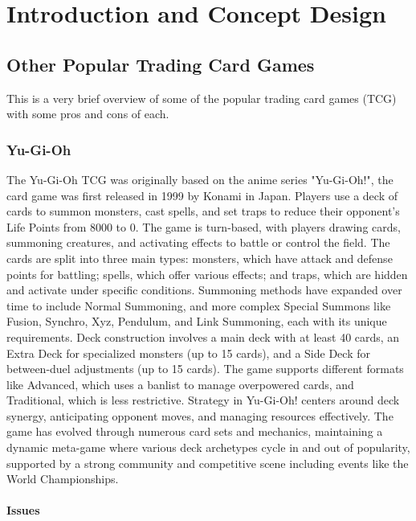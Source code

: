 \chapter{Introduction and Concept Design}




\section{Other Popular Trading Card Games}

This is a very brief overview of some of the popular trading card games (TCG) with some pros and cons of each.


\subsection{Yu-Gi-Oh}

The Yu-Gi-Oh TCG was originally based on the anime series "Yu-Gi-Oh!", the card game was first released in 1999 by Konami in Japan. Players use a deck of cards to summon monsters, cast spells, and set traps to reduce their opponent's Life Points from 8000 to 0. The game is turn-based, with players drawing cards, summoning creatures, and activating effects to battle or control the field. The cards are split into three main types: monsters, which have attack and defense points for battling; spells, which offer various effects; and traps, which are hidden and activate under specific conditions. Summoning methods have expanded over time to include Normal Summoning, and more complex Special Summons like Fusion, Synchro, Xyz, Pendulum, and Link Summoning, each with its unique requirements. Deck construction involves a main deck with at least 40 cards, an Extra Deck for specialized monsters (up to 15 cards), and a Side Deck for between-duel adjustments (up to 15 cards). The game supports different formats like Advanced, which uses a banlist to manage overpowered cards, and Traditional, which is less restrictive. Strategy in Yu-Gi-Oh! centers around deck synergy, anticipating opponent moves, and managing resources effectively. The game has evolved through numerous card sets and mechanics, maintaining a dynamic meta-game where various deck archetypes cycle in and out of popularity, supported by a strong community and competitive scene including events like the World Championships.


\subsubsection{Issues}

